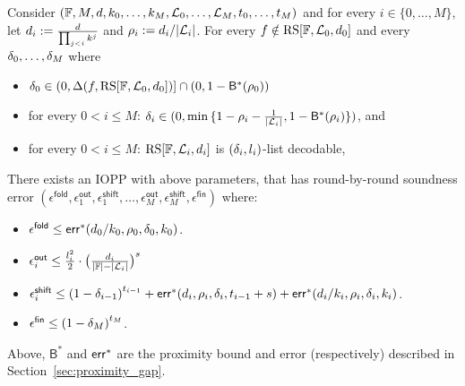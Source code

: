 \begin{lemma}\label{lemma:rnd_by_rnd_soundness}
    Consider $(\mathbb{F},M,d,k_0,\ldots,k_M,\mathcal{L}_0,\ldots,\mathcal{L}_M,t_0,\ldots,t_M)$ and for every $i\in\{0,\ldots,M\}$, let $d_i:=\frac{d}{\prod_{j<i}k^j}$ and $\rho_i:=d_i/|\mathcal{L}_i|$. For every $f\notin\mathrm{RS}[\mathbb{F},\mathcal{L}_0,d_0]$ and every $\delta_0,\ldots,\delta_M$ where
    \begin{itemize}
        \item $\delta_0\in(0,\Delta(f,\mathrm{RS}[\mathbb{F},\mathcal{L}_0,d_0])]\cap(0,1-{\mathsf{B}}^*(\rho_0))$
        \item for every $0<i\leq M$: $\delta_i\in(0,\min{\{1-\rho_i-\frac{1}{|\mathcal{L}_i|},1-{\mathsf{B}^*(\rho_i)}\}})$, and
        \item for every $0<i\leq M$: $\mathrm{RS}[\mathbb{F},\mathcal{L}_i,d_i]$ is $(\delta_i,l_i)$-list decodable,
    \end{itemize}
    There exists an IOPP with above parameters, that has round-by-round soundness error $(\epsilon^{\mathsf{fold}},\epsilon^{\mathsf{out}}_1,\epsilon^{\mathsf{shift}}_1,\ldots,\epsilon^{\mathsf{out}}_M,\epsilon^{\mathsf{shift}}_M,\epsilon^{\mathsf{fin}})$ where:
    \begin{itemize}
        \item $\epsilon^{\mathsf{fold}}\leq\mathsf{err}^*(d_0/k_0,\rho_0,\delta_0,k_0)$.
        \item $\epsilon^{\mathsf{out}}_i\leq\frac{l^2_i}{2}\cdot{\big(\frac{d_i}{|\mathbb{F}|-|\mathcal{L}_i|}\big)}^s$
        \item $\epsilon^{\mathsf{shift}}_i\leq {(1-\delta_{i-1})}^{t_{i-1}}+\mathsf{err}^*(d_i,\rho_i,\delta_i,t_{i-1}+s)+\mathsf{err}^*(d_i/k_i,\rho_i,\delta_i,k_i)$.
        \item $\epsilon^{\mathsf{fin}}\leq{(1-\delta_M)}^{t_M}$.
    \end{itemize}
    Above, ${\mathsf{B}}^*$ and ${\mathsf{err}}^*$ are the proximity bound and error (respectively) described in Section~\ref{sec:proximity_gap}.
\end{lemma}

